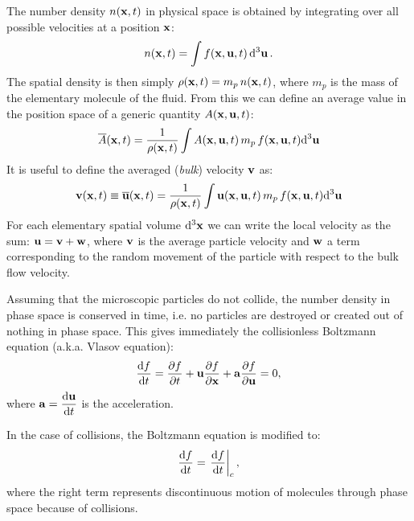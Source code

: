 The number density $n(\boldsymbol{\mathbf{x}}, t)$ in physical space is obtained by integrating over all possible velocities at a position $\boldsymbol{\mathbf{x}}$:
\begin{equation}
n(\boldsymbol{\mathbf{x}}, t ) = \int f(\boldsymbol{\mathbf{x}}, \boldsymbol{\mathbf{u}}, t) \dd[3]{\boldsymbol{\mathbf{u}}}.
\end{equation}
The spatial density is then simply $\rho(\boldsymbol{\mathbf{x}}, t) = m_p\,n(\boldsymbol{\mathbf{x}}, t)$, where $m_p$ is the mass of the elementary molecule of the fluid.
From this we can define an average value in the position space of a generic quantity $A(\boldsymbol{\mathbf{x}}, \boldsymbol{\mathbf{u}}, t)$:
\begin{equation}
 \label{eq:df_average}
 \overline{A} (\boldsymbol{\mathbf{x}}, t) = \frac{1}{\rho(\boldsymbol{\mathbf{x}}, t)}\int{A(\boldsymbol{\mathbf{x}}, \boldsymbol{\mathbf{u}}, t)\, m_p\, f(\boldsymbol{\mathbf{x}}, \boldsymbol{\mathbf{u}}, t) \dd[3] \boldsymbol{\mathbf{u}}}
\end{equation}
It is useful to define the averaged (\emph{bulk}) velocity $\boldsymbol{\mathbf{v}}$ as:
\begin{equation}
  \boldsymbol{\mathbf{v}}(\boldsymbol{\mathbf{x}}, t) \equiv \overline{\boldsymbol{\mathbf{u}}}(\boldsymbol{\mathbf{x}}, t) = \frac{1}{\rho(\boldsymbol{\mathbf{x}}, t)}\int{\boldsymbol{\mathbf{u}}(\boldsymbol{\mathbf{x}}, \boldsymbol{\mathbf{u}}, t)\, m_p\, f(\boldsymbol{\mathbf{x}}, \boldsymbol{\mathbf{u}}, t) \dd[3] \boldsymbol{\mathbf{u}}}
\end{equation}
For each elementary spatial volume $\dd[3] \boldsymbol{\mathbf{x}}$ we can write the local velocity as the sum: $\boldsymbol{\mathbf{u}} = \boldsymbol{\mathbf{v}} + \boldsymbol{\mathbf{w}}$, where $\boldsymbol{\mathbf{v}}$ is the average particle velocity and $\boldsymbol{\mathbf{w}}$ a term corresponding to the random movement of the particle with respect to the bulk flow velocity.

Assuming that the microscopic particles do not collide, the number density in phase space is conserved in time, i.e. no particles are destroyed or created out of nothing in phase space.
This gives immediately the collisionless Boltzmann equation (a.k.a. Vlasov equation):
\begin{equation}
\label{eq:vlasov}
\dv{f}{t}(\boldsymbol{\mathbf{x}}, \boldsymbol{\mathbf{u}}, t) = \pdv{f}{t} + \boldsymbol{\mathbf{u}} \pdv{f}{\boldsymbol{\mathbf{x}}} + \boldsymbol{\mathbf{a}} \pdv{f}{\boldsymbol{\mathbf{u}}} = 0,
\end{equation}
where $\displaystyle \boldsymbol{\mathbf{a}} = \dv{\boldsymbol{\mathbf{u}}}{t}$ is the acceleration.

In the case of collisions, the Boltzmann equation is modified to:
\begin{equation}
\label{eq:boltzmann}
\dv{f}{t}(\boldsymbol{\mathbf{x}}, \boldsymbol{\mathbf{u}}, t) = \left.\dv{f}{t}\right|_c,
\end{equation}
where the right term represents discontinuous motion of molecules through phase space because of collisions.

